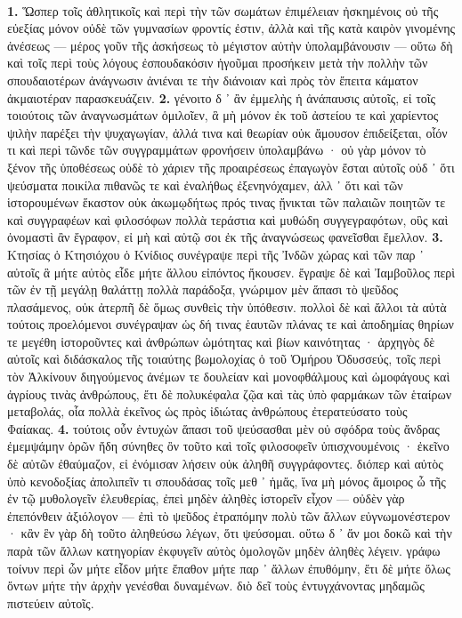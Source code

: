 \documentclass[a4paper, 11pt, oneside, polutonikogreek, german]{article}
\begin{document}
\paragraph{}
\textbf{1.} Ὥσπερ τοῖς ἀθλητικοῖς καὶ περὶ τὴν τῶν σωμάτων ἐπιμέλειαν ἠσκημένοις οὐ τῆς εὐεξίας μόνον οὐδὲ τῶν γυμνασίων φροντίς ἐστιν, ἀλλὰ καὶ τῆς κατὰ καιρὸν γινομένης ἀνέσεως --- μέρος γοῦν τῆς ἀσκήσεως τὸ μέγιστον αὐτὴν ὑπολαμβάνουσιν --- οὕτω δὴ καὶ τοῖς περὶ τοὺς λόγους ἐσπουδακόσιν ἡγοῦμαι προσήκειν μετὰ τὴν πολλὴν τῶν σπουδαιοτέρων ἀνάγνωσιν ἀνιέναι τε τὴν διάνοιαν καὶ πρὸς τὸν ἔπειτα κάματον ἀκμαιοτέραν παρασκευάζειν. \textbf{2.} γένοιτο δ ᾽ ἂν ἐμμελὴς ἡ ἀνάπαυσις αὐτοῖς, εἰ τοῖς τοιούτοις τῶν ἀναγνωσμάτων ὁμιλοῖεν, ἃ μὴ μόνον ἐκ τοῦ ἀστείου τε καὶ χαρίεντος ψιλὴν παρέξει τὴν ψυχαγωγίαν, ἀλλά τινα καὶ θεωρίαν οὐκ ἄμουσον ἐπιδείξεται, οἷόν τι καὶ περὶ τῶνδε τῶν συγγραμμάτων φρονήσειν ὑπολαμβάνω · οὐ γὰρ μόνον τὸ ξένον τῆς ὑποθέσεως οὐδὲ τὸ χάριεν τῆς προαιρέσεως ἐπαγωγὸν ἔσται αὐτοῖς οὐδ ᾽ ὅτι ψεύσματα ποικίλα πιθανῶς τε καὶ ἐναλήθως ἐξενηνόχαμεν, ἀλλ ᾽ ὅτι καὶ τῶν ἱστορουμένων ἕκαστον οὐκ ἀκωμῳδήτως πρός τινας ᾔνικται τῶν παλαιῶν ποιητῶν τε καὶ συγγραφέων καὶ φιλοσόφων πολλὰ τεράστια καὶ μυθώδη συγγεγραφότων, οὓς καὶ ὀνομαστὶ ἂν ἔγραφον, εἰ μὴ καὶ αὐτῷ σοι ἐκ τῆς ἀναγνώσεως φανεῖσθαι ἔμελλον. \textbf{3.} Κτησίας ὁ Κτησιόχου ὁ Κνίδιος συνέγραψε περὶ τῆς Ἰνδῶν χώρας καὶ τῶν παρ ᾽ αὐτοῖς ἃ μήτε αὐτὸς εἶδε μήτε ἄλλου εἰπόντος ἤκουσεν. ἔγραψε δὲ καὶ Ἰαμβοῦλος περὶ τῶν ἐν τῇ μεγάλῃ θαλάττῃ πολλὰ παράδοξα, γνώριμον μὲν ἅπασι τὸ ψεῦδος πλασάμενος, οὐκ ἀτερπῆ δὲ ὅμως συνθεὶς τὴν ὑπόθεσιν. πολλοὶ δὲ καὶ ἄλλοι τὰ αὐτὰ τούτοις προελόμενοι συνέγραψαν ὡς δή τινας ἑαυτῶν πλάνας τε καὶ ἀποδημίας θηρίων τε μεγέθη ἱστοροῦντες καὶ ἀνθρώπων ὠμότητας καὶ βίων καινότητας · ἀρχηγὸς δὲ αὐτοῖς καὶ διδάσκαλος τῆς τοιαύτης βωμολοχίας ὁ τοῦ Ὁμήρου Ὀδυσσεύς, τοῖς περὶ τὸν Ἀλκίνουν διηγούμενος ἀνέμων τε δουλείαν καὶ μονοφθάλμους καὶ ὠμοφάγους καὶ ἀγρίους τινὰς ἀνθρώπους, ἔτι δὲ πολυκέφαλα ζῷα καὶ τὰς ὑπὸ φαρμάκων τῶν ἑταίρων μεταβολάς, οἷα πολλὰ ἐκεῖνος ὡς πρὸς ἰδιώτας ἀνθρώπους ἐτερατεύσατο τοὺς Φαίακας. \textbf{4.} τούτοις οὖν ἐντυχὼν ἅπασι τοῦ ψεύσασθαι μὲν οὐ σφόδρα τοὺς ἄνδρας ἐμεμψάμην ὁρῶν ἤδη σύνηθες ὂν τοῦτο καὶ τοῖς φιλοσοφεῖν ὑπισχνουμένοις · ἐκεῖνο δὲ αὐτῶν ἐθαύμαζον, εἰ ἐνόμισαν λήσειν οὐκ ἀληθῆ συγγράφοντες. διόπερ καὶ αὐτὸς ὑπὸ κενοδοξίας ἀπολιπεῖν τι σπουδάσας τοῖς μεθ ᾽ ἡμἄς, ἵνα μὴ μόνος ἄμοιρος ὦ τῆς ἐν τῷ μυθολογεῖν ἐλευθερίας, ἐπεὶ μηδὲν ἀληθὲς ἱστορεῖν εἶχον --- οὐδὲν γὰρ ἐπεπόνθειν ἀξιόλογον --- ἐπὶ τὸ ψεῦδος ἐτραπόμην πολὺ τῶν ἄλλων εὐγνωμονέστερον · κἂν ἓν γὰρ δὴ τοῦτο ἀληθεύσω λέγων, ὅτι ψεύσομαι. οὕτω δ ᾽ ἄν μοι δοκῶ καὶ τὴν παρὰ τῶν ἄλλων κατηγορίαν ἐκφυγεῖν αὐτὸς ὁμολογῶν μηδὲν ἀληθὲς λέγειν. γράφω τοίνυν περὶ ὧν μήτε εἶδον μήτε ἔπαθον μήτε παρ ᾽ ἄλλων ἐπυθόμην, ἔτι δὲ μήτε ὅλως ὄντων μήτε τὴν ἀρχὴν γενέσθαι δυναμένων. διὸ δεῖ τοὺς ἐντυγχάνοντας μηδαμῶς πιστεύειν αὐτοῖς.
\end{document}
